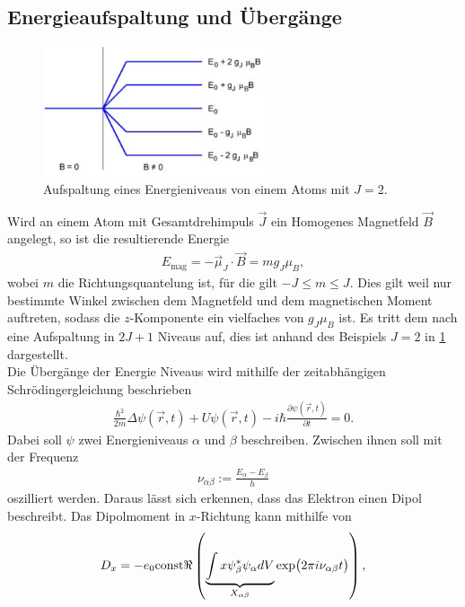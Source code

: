 \subsection{Energieaufspaltung und Übergänge}
\begin{figure}[h!]
	\centering
	\includegraphics[width=0.6\textwidth]{../Grafiken/fig_theo_Aufspaltung.pdf}
	\caption{Aufspaltung eines Energieniveaus von einem Atoms mit $J=2$. \cite{V27}}\label{fig:Theo_Aufspaltung}
\end{figure}
\noindent
Wird an einem Atom mit Gesamtdrehimpuls $\vec{J}$ ein Homogenes Magnetfeld $\vec{B}$ angelegt, so ist die resultierende Energie
\begin{align}
	E_\text{mag}= -\vec{\mu}_J\cdot\vec{B}=mg_J\mu_B,
\end{align}
wobei $m$ die Richtungsquantelung ist, für die gilt $-J\le m\le J$.
Dies gilt weil nur bestimmte Winkel zwischen dem Magnetfeld und dem magnetischen Moment auftreten, sodass die $z$-Komponente ein vielfaches von $g_J\mu_B$ ist.
Es tritt dem nach eine Aufspaltung in $2J+1$ Niveaus auf, dies ist anhand des Beispiels $J=2$ in \cref{fig:Theo_Aufspaltung} dargestellt.\\
Die Übergänge der Energie Niveaus wird mithilfe der zeitabhängigen Schrödingergleichung beschrieben
\begin{align}
	\frac{\hbar^2}{2m}\Delta \psi(\vec{r},t)+U\psi(\vec{r},t)-i\hbar\frac{\partial \psi(\vec{r},t)}{\partial t}=0.
\end{align}
Dabei soll $\psi$ zwei Energieniveaus $\alpha$ und $\beta$ beschreiben.
Zwischen ihnen soll mit der Frequenz
\begin{align}
	\nu_{\alpha\beta}:=\frac{E_\alpha-E_\beta}{h}
\end{align}
oszilliert werden.
Daraus lässt sich erkennen, dass das Elektron einen Dipol beschreibt.
Das Dipolmoment in $x$-Richtung kann mithilfe von
\begin{align}
	D_x=-e_0\text{const}\real\left( \underbrace{\int x\psi^*_\beta\psi_\alpha dV}_{X_{\alpha\beta}}\exp(2\pi i\nu_{\alpha\beta}t) \right),
\end{align}
